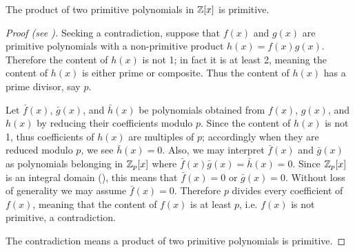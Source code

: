 \begin{lemma}[Gauss]\label{lemma-gauss-for-integer-coefficients}
    The product of two primitive polynomials in $\mathbb{Z}[x]$ is primitive.
\end{lemma}
\begin{proof}[Proof (see {\cite[p.~291]{gallian_2016}})]
    Seeking a contradiction, suppose that $f(x)$ and $g(x)$ are primitive polynomials with a non-primitive product $h(x) = f(x)g(x)$. Therefore the content of $h(x)$ is not 1; in fact it is at least 2, meaning the content of $h(x)$ is either prime or composite. Thus the content of $h(x)$ has a prime divisor, say $p$.

    Let $\bar{f}(x)$, $\bar{g}(x)$, and $\bar{h}(x)$ be polynomials obtained from $f(x)$, $g(x)$, and $h(x)$ by reducing their coefficients modulo $p$. Since the content of $h(x)$ is not 1, thus coefficients of $h(x)$ are multiples of $p$; accordingly when they are reduced modulo $p$, we see $\bar{h}(x) = 0$. Also, we may interpret $\bar{f}(x)$ and $\bar{g}(x)$ as polynomials belonging in $\mathbb{Z}_p[x]$ where $\bar{f}(x)\bar{g}(x) = \bar{h}(x) = 0$. Since $\mathbb{Z}_p[x]$ is an integral domain (), this means that $\bar{f}(x) = 0$ or $\bar{g}(x) = 0$. Without loss of generality we may assume $\bar{f}(x) = 0$. Therefore $p$ divides every coefficient of $f(x)$, meaning that the content of $f(x)$ is at least $p$, i.e. $f(x)$ is not primitive, a contradiction.

    The contradiction means a product of two primitive polynomials is primitive.
\end{proof}

